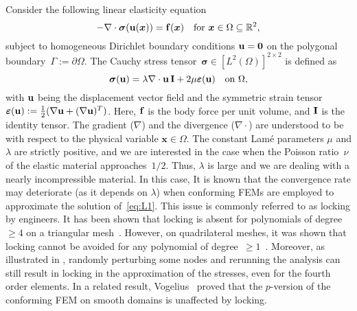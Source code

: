\documentclass[11pt]{article}
\newcommand{\vf}{{\bf f}}
\newcommand{\vu}{{\bf u}}
\newcommand{\bsx}{{\boldsymbol{x}}}
\newcommand{\vsigma}{\boldsymbol{\sigma}}
\newcommand{\R}{\mathbb{R}}
\numberwithin{equation}{section}
\newcommand{\veps}{{\boldsymbol{\varepsilon}}}
\begin{document}
Consider the following linear elasticity equation 
\begin{equation}
 -\nabla \cdot \vsigma(\vu(\bsx)) = \vf(\bsx) \quad \text{for $\bsx \in \Omega\subseteq\R^2$,}
\label{eq:L1}
\end{equation}
subject to homogeneous Dirichlet boundary conditions $\vu = {\bf 0}$ on the polygonal 
boundary~$\Gamma:=\partial \Omega$. The   Cauchy stress 
tensor~$\vsigma \in [L^2(\Omega)]^{2\times 2}$ is defined as 
\[\vsigma(\vu) = \lambda \nabla\cdot \vu\, {\bf I} 
+ 2\mu \veps(\vu)\quad\text{on $\Omega$,} \] 
with $\vu$ being the displacement vector field and the symmetric strain 
tensor~$\veps(\vu) := \frac{1}{2} (\nabla \vu + (\nabla \vu)^T)$.
Here, $\vf$ is the body force per unit volume, and ${\bf I}$ is the identity tensor.   The gradient ($\nabla$) and the divergence ($\nabla \cdot$) are understood to be with respect to the physical variable $\bsx \in \Omega$.  The constant  Lam\'e parameters  $\mu$ and $\lambda$ are strictly positive, and we are interested in the case when the Poisson ratio~$\nu$ of the elastic material approaches~$1/2$.  Thus,  $\lambda$ is large and we are dealing with a nearly incompressible material. {\color{red} In this case, It is known that the convergence rate may deteriorate (as it depends on $\lambda$) when conforming FEMs are employed to approximate the solution of~\eqref{eq:L1}. This issue is commonly referred to as locking by engineers. It has been shown that locking is absent for polynomials of degree ~$\ge 4$ on a triangular mesh~\cite{ScottVogelius1985}. However, on quadrilateral meshes, it was shown that locking cannot be  avoided for any polynomial of degree~$\ge 1$~\cite{BabuskaSuri1992}. Moreover, as illustrated in \cite[Figures 4a and 4b]{AinsworthParker2022},  randomly perturbing some nodes and rerunning  the  analysis can still result in locking in the approximation of the stresses, even for the fourth order elements.} In a related result,  Vogelius~\cite{Vogelius1983} proved that the $p$-version of the conforming FEM on smooth domains is  unaffected by locking. 
\end{document}
